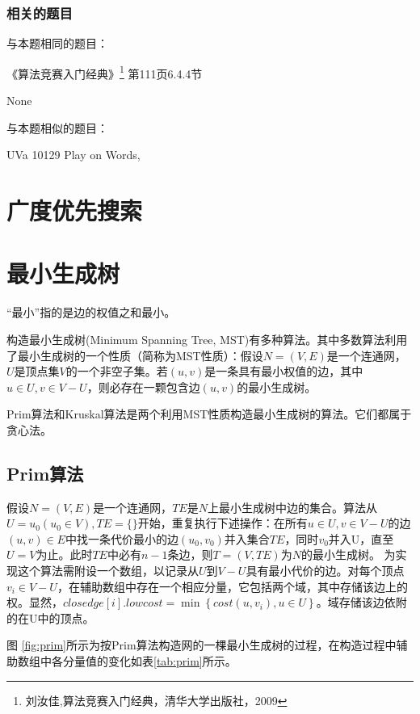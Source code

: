 \subsubsection{相关的题目}
与本题相同的题目：
\begindot
\item 《算法竞赛入门经典》\footnote{刘汝佳,算法竞赛入门经典，清华大学出版社，2009} 第111页6.4.4节
\item  None
\myenddot

与本题相似的题目：
\begindot
\item  UVa 10129 Play on Words, 
\myenddot


\section{广度优先搜索} %



\section{最小生成树} %
“最小”指的是边的权值之和最小。

构造最小生成树(Minimum Spanning Tree, MST)有多种算法。其中多数算法利用了最小生成树的一个性质（简称为MST性质）：假设$N=(V, E)$是一个连通网，$U$是顶点集$V$的一个非空子集。若$(u, v)$是一条具有最小权值的边，其中$u \in U, v \in V-U$，则必存在一颗包含边$(u, v)$的最小生成树。

Prim算法和Kruskal算法是两个利用MST性质构造最小生成树的算法。它们都属于贪心法。

\subsection{Prim算法}
假设$N=(V, E)$是一个连通网，$TE$是$N$上最小生成树中边的集合。算法从$U={u_0}(u_0 \in V), TE=\{\}$开始，重复执行下述操作：在所有$u \in U, v \in V-U$的边$(u, v) \in E$中找一条代价最小的边$(u_0, v_0)$并入集合$TE$，同时$v_0$并入U，直至$U=V$为止。此时$TE$中必有$n-1$条边，则$T=(V, TE)$为$N$的最小生成树。
为实现这个算法需附设一个数组，以记录从$U$到$V-U$具有最小代价的边。对每个顶点$v_i \in V-U$，在辅助数组中存在一个相应分量，它包括两个域，其中存储该边上的权。显然，$closedge[i].lowcost=\min\left\{cost(u, v_i), u \in U\right\}$。域存储该边依附的在U中的顶点。

图 \ref{fig:prim}所示为按Prim算法构造网的一棵最小生成树的过程，在构造过程中辅助数组中各分量值的变化如表\ref{tab:prim}所示。

